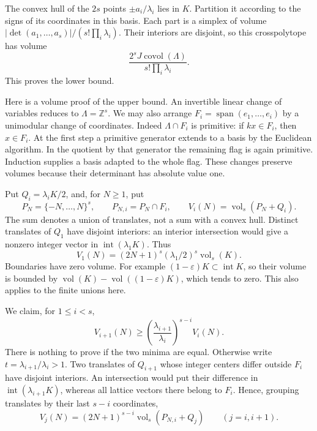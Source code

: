 \documentclass[
  11pt,
  a4paper,
]{article}
\begin{document}
The convex hull of the \(2s\) points \(\pm a_i/\lambda_i\) lies in
\(K\). Partition it according to the signs of its coordinates in this
basis. Each part is a simplex of volume
\(|\det(a_1,\ldots,a_s)|/(s!\prod_i\lambda_i)\). Their interiors are
disjoint, so this crosspolytope has volume \[
\frac{2^sJ\operatorname{covol}(\Lambda)}
{s!\prod_i\lambda_i}.
\] This proves the lower bound.

Here is a volume proof of the upper bound. An invertible linear change
of variables reduces to \(\Lambda=\mathbb Z^s\). We may also arrange
\(F_i=\operatorname{span}(e_1,\ldots,e_i)\) by a unimodular change of
coordinates. Indeed \(\Lambda\cap F_i\) is primitive: if \(kx\in F_i\),
then \(x\in F_i\). At the first step a primitive generator extends to a
basis by the Euclidean algorithm. In the quotient by that generator the
remaining flag is again primitive. Induction supplies a basis adapted to
the whole flag. These changes preserve volumes because their determinant
has absolute value one.

Put \(Q_i=\lambda_iK/2\), and, for \(N\ge1\), put \[
P_N=\{-N,\ldots,N\}^s,\qquad
P_{N,i}=P_N\cap F_i,\qquad
V_i(N)=\operatorname{vol}_s(P_N+Q_i).
\] The sum denotes a union of translates, not a sum with a convex hull.
Distinct translates of \(Q_1\) have disjoint interiors: an interior
intersection would give a nonzero integer vector in
\(\operatorname{int}(\lambda_1K)\). Thus \[
V_1(N)=(2N+1)^s(\lambda_1/2)^s\operatorname{vol}_s(K).
\] Boundaries have zero volume. For example
\((1-\varepsilon)K\subset\operatorname{int}K\), so their volume is
bounded by
\(\operatorname{vol}(K)-\operatorname{vol}((1-\varepsilon)K)\), which
tends to zero. This also applies to the finite unions here.

We claim, for \(1\le i<s\), \[
V_{i+1}(N)\ge
\left(\frac{\lambda_{i+1}}{\lambda_i}\right)^{s-i}V_i(N).
\tag{8.47}
\] There is nothing to prove if the two minima are equal. Otherwise
write \(t=\lambda_{i+1}/\lambda_i>1\). Two translates of \(Q_{i+1}\)
whose integer centers differ outside \(F_i\) have disjoint interiors. An
intersection would put their difference in
\(\operatorname{int}(\lambda_{i+1}K)\), whereas all lattice vectors
there belong to \(F_i\). Hence, grouping translates by their last
\(s-i\) coordinates, \[
V_j(N)=(2N+1)^{s-i}
\operatorname{vol}_s(P_{N,i}+Q_j)\qquad(j=i,i+1).
\]
\end{document}
